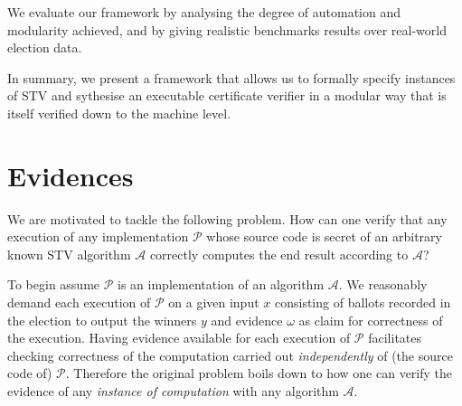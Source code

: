 \documentclass[10pt,conference]{IEEEtran}
\begin{document}

We evaluate our framework by analysing the degree of automation and modularity achieved, and by giving realistic benchmarks results over real-world election data.

In summary, we present a framework that allows us to formally specify instances of STV and sythesise an executable certificate verifier in a modular way that is itself verified down to the machine level.
\section{Evidences}
\label{sec:DataEv}
  
We are motivated to 
tackle the following problem. How can one verify that any execution of any implementation $\mathcal{P}$ whose source code is secret of an arbitrary  known STV algorithm $\mathcal{A}$ correctly computes the end result according to  $\mathcal{A}$?  



To begin 
assume $\mathcal{P}$ is an implementation of an algorithm $\mathcal{A}$. We reasonably demand each execution of $\mathcal{P}$ on a given input $x$ consisting of ballots recorded in the election to output the winners $y$ and evidence $\omega$ as claim  for correctness of the execution.  
 Having evidence available for each execution of $\mathcal{P}$ facilitates checking correctness of the computation carried out \emph{independently} of (the source code of) $\mathcal{P}$. Therefore the original problem boils down to how one can verify the evidence of any \emph{instance of computation} with any algorithm $\mathcal{A}$.
\end{document}
